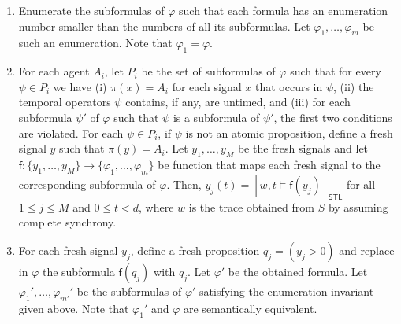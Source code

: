\begin{enumerate}[label=\arabic*.]
	\item
	Enumerate the subformulas of $\varphi$ such that each formula has an enumeration number smaller than the numbers of all its subformulas.
	Let $\varphi_1, \ldots, \varphi_m$ be such an enumeration.
	Note that $\varphi_1 = \varphi$.
	
	\item
	For each agent $A_i$, let $P_i$ be the set of subformulas of $\varphi$ such that for every $\psi \in P_i$ we have
	(i) $\pi(x) = A_i$ for each signal $x$ that occurs in $\psi$,
	(ii) the temporal operators $\psi$ contains, if any, are untimed, and
	(iii) for each subformula $\psi'$ of $\varphi$ such that $\psi$ is a subformula of $\psi'$, the first two conditions are violated.
	For each $\psi \in P_i$, if $\psi$ is not an atomic proposition, define a fresh signal $y$ such that $\pi(y) = A_i$.
	Let $y_1, \ldots, y_M$ be the fresh signals and let $\mathsf{f} : \{y_1, \ldots, y_M\} \to \{\varphi_1, \ldots, \varphi_m\}$ be function that maps each fresh signal to the corresponding subformula of $\varphi$.
	Then, $y_j(t) = [w,t \models \mathsf{f}(y_j)]_{\mathsf{STL}}$ for all $1 \leq j \leq M$ and $0 \leq t < d$, where $w$ is the trace obtained from $S$ by assuming complete synchrony.
	
	
	
	\item
	For each fresh signal $y_j$, define a fresh proposition $q_j = (y_j > 0)$ and replace in $\varphi$ the subformula $\mathsf{f}(q_j)$ with $q_j$.
	Let $\varphi'$ be the obtained formula.
	Let $\varphi_1', \ldots, \varphi_{m'}'$ be the subformulas of $\varphi'$ satisfying the enumeration invariant given above.
	Note that $\varphi_1'$  and $\varphi$ are semantically equivalent. %
	

\end{enumerate}
